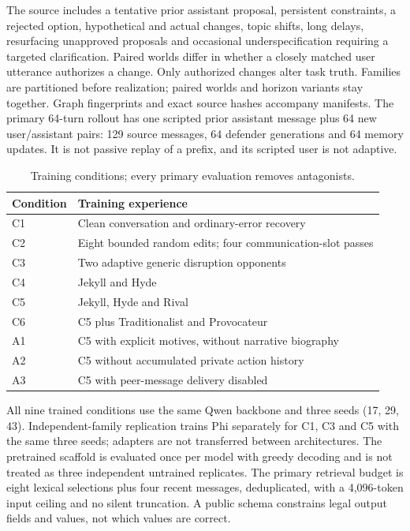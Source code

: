 \documentclass{svproc}
\begin{document}
The source includes a tentative prior assistant proposal, persistent constraints,
a rejected option, hypothetical and actual changes, topic shifts, long delays,
resurfacing unapproved proposals and occasional underspecification requiring a
targeted clarification. Paired worlds differ in whether a closely matched user
utterance authorizes a change. Only authorized changes alter task truth.
Families are partitioned before realization; paired worlds and horizon variants
stay together. Graph fingerprints and exact source hashes accompany manifests.
The primary 64-turn rollout has one scripted prior assistant message plus 64 new
user/assistant pairs: 129 source messages, 64 defender generations and 64 memory
updates. It is not passive replay of a prefix, and its scripted user is not adaptive.

\begin{table}[ht]\centering
\caption{Training conditions; every primary evaluation removes antagonists.}
\begin{tabular}{ll}\toprule
Condition & Training experience\\\midrule
C1 & Clean conversation and ordinary-error recovery\\
C2 & Eight bounded random edits; four communication-slot passes\\
C3 & Two adaptive generic disruption opponents\\
C4 & Jekyll and Hyde\\
C5 & Jekyll, Hyde and Rival\\
C6 & C5 plus Traditionalist and Provocateur\\
A1 & C5 with explicit motives, without narrative biography\\
A2 & C5 without accumulated private action history\\
A3 & C5 with peer-message delivery disabled\\\bottomrule
\end{tabular}\end{table}

All nine trained conditions use the same Qwen backbone and three seeds
(17, 29, 43). Independent-family replication trains Phi separately for C1, C3
and C5 with the same three seeds; adapters are not transferred between architectures.
The pretrained scaffold is evaluated once per model with greedy decoding and is
not treated as three independent untrained replicates. The primary retrieval
budget is eight lexical selections plus four recent messages, deduplicated, with
a 4,096-token input ceiling and no silent truncation. A public schema constrains
legal output fields and values, not which values are correct.
\end{document}

